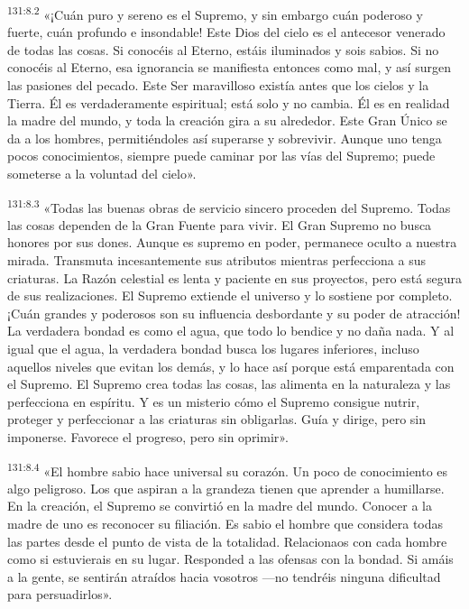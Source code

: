 \par 
\textsuperscript{131:8.2} «¡Cuán puro y sereno es el Supremo, y sin embargo cuán poderoso y fuerte, cuán profundo e insondable! Este Dios del cielo es el antecesor venerado de todas las cosas. Si conocéis al Eterno, estáis iluminados y sois sabios. Si no conocéis al Eterno, esa ignorancia se manifiesta entonces como mal, y así surgen las pasiones del pecado. Este Ser maravilloso existía antes que los cielos y la Tierra. Él es verdaderamente espiritual; está solo y no cambia. Él es en realidad la madre del mundo, y toda la creación gira a su alrededor. Este Gran Único se da a los hombres, permitiéndoles así superarse y sobrevivir. Aunque uno tenga pocos conocimientos, siempre puede caminar por las vías del Supremo; puede someterse a la voluntad del cielo».

\par 
\textsuperscript{131:8.3} «Todas las buenas obras de servicio sincero proceden del Supremo. Todas las cosas dependen de la Gran Fuente para vivir. El Gran Supremo no busca honores por sus dones. Aunque es supremo en poder, permanece oculto a nuestra mirada. Transmuta incesantemente sus atributos mientras perfecciona a sus criaturas. La Razón celestial es lenta y paciente en sus proyectos, pero está segura de sus realizaciones. El Supremo extiende el universo y lo sostiene por completo. ¡Cuán grandes y poderosos son su influencia desbordante y su poder de atracción! La verdadera bondad es como el agua, que todo lo bendice y no daña nada. Y al igual que el agua, la verdadera bondad busca los lugares inferiores, incluso aquellos niveles que evitan los demás, y lo hace así porque está emparentada con el Supremo. El Supremo crea todas las cosas, las alimenta en la naturaleza y las perfecciona en espíritu. Y es un misterio cómo el Supremo consigue nutrir, proteger y perfeccionar a las criaturas sin obligarlas. Guía y dirige, pero sin imponerse. Favorece el progreso, pero sin oprimir».

\par 
\textsuperscript{131:8.4} «El hombre sabio hace universal su corazón. Un poco de conocimiento es algo peligroso. Los que aspiran a la grandeza tienen que aprender a humillarse. En la creación, el Supremo se convirtió en la madre del mundo. Conocer a la madre de uno es reconocer su filiación. Es sabio el hombre que considera todas las partes desde el punto de vista de la totalidad. Relacionaos con cada hombre como si estuvierais en su lugar. Responded a las ofensas con la bondad. Si amáis a la gente, se sentirán atraídos hacia vosotros ---no tendréis ninguna dificultad para persuadirlos».

